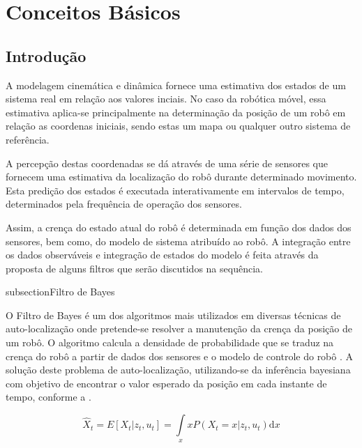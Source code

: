 \chapter{Conceitos Básicos}


% 

 
\section{Introdução}\label{intro::cap3}

A modelagem cinemática e dinâmica fornece uma estimativa dos estados de um sistema real em relação aos valores inciais. No caso da robótica móvel, essa estimativa aplica-se principalmente na determinação da posição de um robô em relação as coordenas iniciais, sendo estas um mapa ou qualquer outro sistema de referência.

A percepção destas coordenadas se dá através de uma série de sensores que fornecem uma estimativa da localização do robô durante determinado movimento. Esta predição dos estados é executada interativamente em intervalos de tempo, determinados pela frequência de operação dos sensores. 

Assim, a crença do estado atual do robô é determinada em função dos dados dos sensores, bem como, do modelo de sistema atribuído ao robô. A integração entre os dados observáveis e integração de estados do modelo é feita através da proposta de alguns filtros que serão discutidos na sequência. 

subsection{Filtro de Bayes}

O Filtro de Bayes é um dos algoritmos mais utilizados em diversas técnicas de auto-localização onde pretende-se resolver a manutenção da crença da posição de um robô. O algoritmo calcula a densidade de probabilidade que se traduz na crença do robô a partir de dados dos sensores e o modelo de controle do robô  \cite{thrun2006probalistic}. A solução deste problema de auto-localização, utilizando-se da inferência bayesiana com objetivo de encontrar o valor esperado da posição em cada instante de tempo, conforme a .

\begin{equation}
    \label{eq:bayes1}
    \hat X_t = E\left[X_t| z_t, u_t\right] = \displaystyle \int\limits_x x P(X_t = x| z_t, u_t)\text{d}x
\end{equation}

